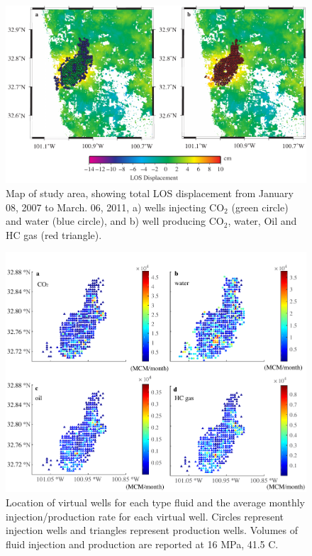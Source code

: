 \clearpage
\begin{figure}
	\centering
	\includegraphics[width=\textwidth]{figs_paper3/Fig5.pdf}	
	\caption{Map of study area, showing total LOS displacement from January 08, 2007 to March. 06, 2011, a) wells injecting CO$_{2}$ (green circle) and water (blue circle), and b) well producing CO$_{2}$, water, Oil and HC gas (red triangle).}
	\label{fig:real_wells}
\end{figure}

\clearpage
\begin{figure}
	\centering
	\includegraphics{figs_paper3/Fig6.pdf}	
	\caption{Location of virtual wells for each type fluid and the average monthly injection/production rate for each virtual well.  Circles represent injection wells and triangles represent production wells.  Volumes of fluid injection and production are reported at 16 MPa, 41.5 \textordmasculine C.}
	\label{fig:virtual_wells}
\end{figure}

